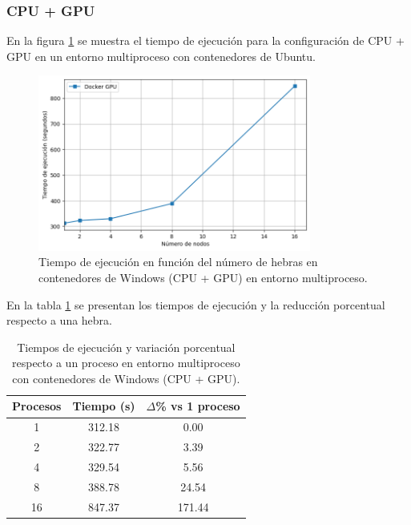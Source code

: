 \subsubsection{CPU + GPU}

En la figura \ref{fig:multi-node_windows_docker_gpu_time} se muestra el tiempo de ejecución para la configuración de CPU + GPU en un entorno multiproceso con contenedores de Ubuntu.

\begin{figure}[ht]
    \centering
    \includegraphics[width=0.8\textwidth]{imagenes/cap5/multi-node_ubuntu_docker_gpu_time.png}
    \caption{Tiempo de ejecución en función del número de hebras en contenedores de Windows (CPU + GPU) en entorno multiproceso.}
    \label{fig:multi-node_windows_docker_gpu_time}
\end{figure}

En la tabla \ref{tab:multi-node_windows_docker_gpu} se presentan los tiempos de ejecución y la reducción porcentual respecto a una hebra.

\begin{table}[ht]
    \centering
    \begin{tabular}{|c|c|c|}
        \hline
        \textbf{Procesos} & \textbf{Tiempo (s)} & \textbf{$\Delta$\% vs 1 proceso} \\
        \hline
        1                 & 312.18              & 0.00                             \\
        2                 & 322.77              & 3.39                             \\
        4                 & 329.54              & 5.56                             \\
        8                 & 388.78              & 24.54                            \\
        16                & 847.37              & 171.44                           \\
        \hline
    \end{tabular}
    \caption{Tiempos de ejecución y variación porcentual respecto a un proceso en entorno multiproceso con contenedores de Windows (CPU + GPU).}
    \label{tab:multi-node_windows_docker_gpu}
\end{table}


